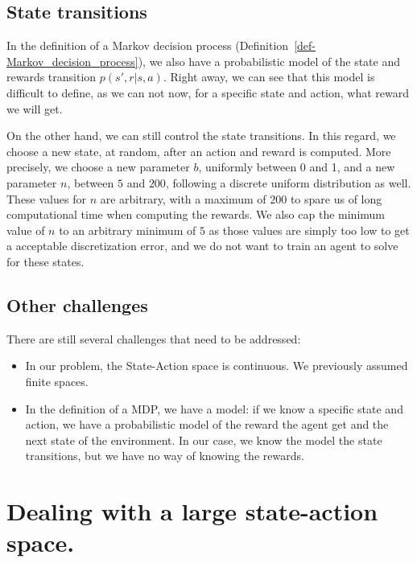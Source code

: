 \documentclass[
  letterpaper,
]{report}
\providecommand{\tightlist}{%
  \setlength{\itemsep}{0pt}\setlength{\parskip}{0pt}}\usepackage{longtable,booktabs,array}
\theoremstyle{plain}
\theoremstyle{definition}
\theoremstyle{definition}
\theoremstyle{remark}
\begin{document}
\hypertarget{state-transitions-1}{%
\subsection*{State transitions}\label{state-transitions-1}}

In the definition of a Markov decision process
(Definition~\ref{def-Markov_decision_process}), we also have a
probabilistic model of the state and rewards transition \(p(s',r|s,a)\).
Right away, we can see that this model is difficult to define, as we can
not now, for a specific state and action, what reward we will get.

On the other hand, we can still control the state transitions. In this
regard, we choose a new state, at random, after an action and reward is
computed. More precisely, we choose a new parameter \(b\), uniformly
between 0 and 1, and a new parameter \(n\), between \(5\) and \(200\),
following a discrete uniform distribution as well. These values for
\(n\) are arbitrary, with a maximum of \(200\) to spare us of long
computational time when computing the rewards. We also cap the minimum
value of \(n\) to an arbitrary minimum of \(5\) as those values are
simply too low to get a acceptable discretization error, and we do not
want to train an agent to solve for these states.

\hypertarget{other-challenges}{%
\subsection*{Other challenges}\label{other-challenges}}

There are still several challenges that need to be addressed:

\begin{itemize}
\tightlist
\item
  In our problem, the State-Action space is continuous. We previously
  assumed finite spaces.
\item
  In the definition of a MDP, we have a model: if we know a specific
  state and action, we have a probabilistic model of the reward the
  agent get and the next state of the environment. In our case, we know
  the model the state transitions, but we have no way of knowing the
  rewards.
\end{itemize}

\hypertarget{dealing-with-a-large-state-action-space.}{%
\section{Dealing with a large state-action
space.}\label{dealing-with-a-large-state-action-space.}}
\end{document}
